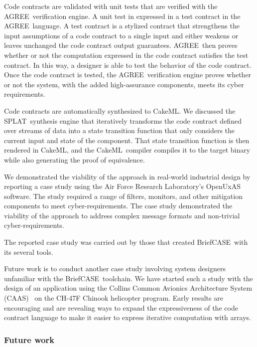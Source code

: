\documentclass[global,twocolumn]{svjour}
\newcommand{\brfcs}{BriefCASE}
\newcommand{\agr}{AGREE}
\newcommand{\splt}{SPLAT}
\newcommand{\ckml}{CakeML}
\begin{document}
Code contracts are validated with unit tests that are verified with the \agr\ verification engine.
%
A unit test in expressed in a test contract in the \agr\ language.
%
A test contract is a stylized contract that strengthens the input assumptions of a code contract to a single input and either weakens or leaves unchanged the code contract output guarantees.
%
\agr\ then proves whether or not the computation expressed in the code contract satisfies the test contract.
%
In this way, a designer is able to test the behavior of the code contract.
%
Once the code contract is tested, the \agr\ verification engine proves whether or not the system, with the added high-assurance components, meets its cyber requirements.

Code contracts are automatically synthesized to \ckml.
%
We discussed the \splt\ synthesis engine that iteratively transforms the code contract defined over streams of data into a state transition function that only considers the current input and state of the component.
%
That state transition function is then rendered in \ckml, and the \ckml\ compiler compiles it to the target binary while also generating the proof of equivalence.

We demonstrated the viability of the approach in real-world industrial design by reporting a case study using the Air Force Research Laboratory's OpenUxAS software.
%
The study required a range of filters, monitors, and other mitigation components to meet cyber-requirements.
%
The case study demonstrated the viability of the approach to address complex message formats and non-trivial cyber-requirements.

The reported case study was carried out by those that created \brfcs\ with its several tools.

Future work is to conduct another case study involving system designers unfamiliar with the \brfcs\ toolchain.
%
We have started such a study with the design of an application using the Collins Common Avionics Architecture System (CAAS)~\cite{caas} on the CH-47F Chinook helicopter program.
%
Early results are encouraging and are revealing ways to expand the expressiveness of the code contract language to make it easier to express iterative computation with arrays.


\subsubsection*{Future work}
\end{document}

